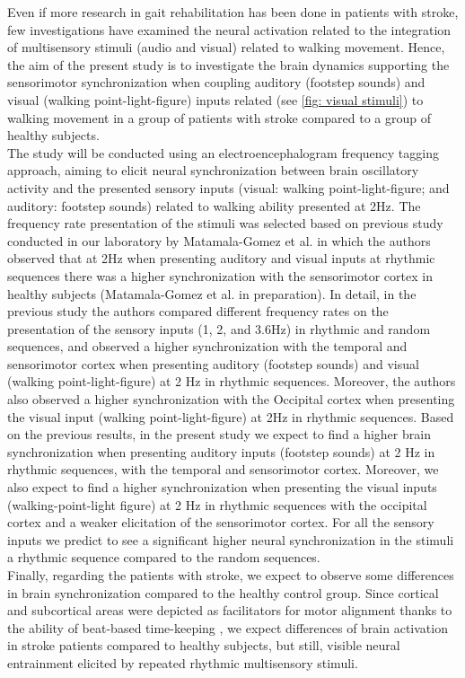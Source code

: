 Even if more research in gait rehabilitation has been done in patients with stroke, few investigations have examined the neural activation related to the integration of multisensory stimuli (audio and visual) related to walking movement. Hence, the aim of the present study is to investigate the brain dynamics supporting the sensorimotor synchronization when coupling auditory (footstep sounds) and visual (walking point-light-figure) inputs related (see \ref{fig: visual stimuli}) to walking movement in a group of patients with stroke compared to a group of healthy subjects. \\
The study will be conducted using an electroencephalogram frequency tagging approach, aiming to elicit neural synchronization between brain oscillatory activity and the presented sensory inputs (visual: walking point-light-figure; and auditory: footstep sounds) related to walking ability presented at 2Hz. The frequency rate presentation of the stimuli was selected based on previous study conducted in our laboratory by Matamala-Gomez et al. in which the authors observed that at 2Hz when presenting auditory and visual inputs at rhythmic sequences there was a higher synchronization with the sensorimotor cortex in healthy subjects (Matamala-Gomez et al. in preparation). In detail, in the previous study the authors compared different frequency rates on the presentation of the sensory inputs (1, 2, and 3.6Hz) in rhythmic and random sequences, and observed a higher synchronization with the temporal and sensorimotor cortex when presenting auditory (footstep sounds) and visual (walking point-light-figure) at 2 Hz in rhythmic sequences. Moreover, the authors also observed a higher synchronization with the Occipital cortex when presenting the visual input (walking point-light-figure) at 2Hz in rhythmic sequences. Based on the previous results, in the present study we expect to find a higher brain synchronization when presenting auditory inputs (footstep sounds) at 2 Hz in rhythmic sequences, with the temporal and sensorimotor cortex. Moreover, we also expect to find a higher synchronization when presenting the visual inputs (walking-point-light figure) at 2 Hz in rhythmic sequences with the occipital cortex and a weaker elicitation of the sensorimotor cortex. For all the sensory inputs we predict to see a significant higher neural synchronization in the stimuli a rhythmic sequence compared to the random sequences. \\
Finally, regarding the patients with stroke, we expect to observe some differences in brain synchronization compared to the healthy control group. Since cortical and subcortical areas were depicted as facilitators for motor alignment thanks to the ability of beat-based time-keeping \parencite{Cannon_2021}, we expect differences of brain activation in stroke patients compared to healthy subjects, but still, visible neural entrainment elicited by repeated rhythmic multisensory stimuli.

